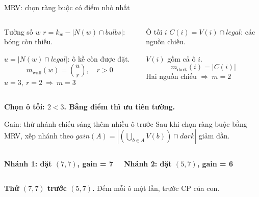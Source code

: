 \begin{frame}{MRV: chọn ràng buộc có điểm nhỏ nhất}
\begin{columns}[T,onlytextwidth]
\begin{block}{Tường số $w$}
\small $r=k_w-|N(w)\cap bulbs|$: bóng còn thiếu.\par
$u=|N(w)\cap legal|$: ô kề còn được đặt.
\[
 m_{\mathrm{wall}}(w)=\binom{u}{r},\quad r>0
\]
\centering $u=3,\ r=2\ \Rightarrow\ \boxed{m=3}$
\end{block}
\begin{block}{Ô tối $i$}
\small $C(i)=V(i)\cap legal$: các nguồn chiếu.\par
$V(i)$ gồm cả ô $i$.
\[
 m_{\mathrm{dark}}(i)=|C(i)|
\]
\centering Hai nguồn chiếu $\Rightarrow\ \boxed{m=2}$
\end{block}
\end{columns}
\vspace{2mm}\centering
\textbf{Chọn ô tối: $2<3$. Bằng điểm thì ưu tiên tường.}
\end{frame}

\begin{frame}{Gain: thử nhánh chiếu sáng thêm nhiều ô trước}
\small Sau khi chọn ràng buộc bằng MRV, xếp nhánh theo
$gain(A)=|(\bigcup_{b\in A}V(b))\cap dark|$ giảm dần.
\begin{columns}[T,onlytextwidth]
\centering
\textbf{Nhánh 1: đặt $(7,7)$, gain = 7}\par\vspace{1mm}

\centering
\textbf{Nhánh 2: đặt $(5,7)$, gain = 6}\par\vspace{1mm}

\end{columns}
\par{}
\small\textbf{Thử $(7,7)$ trước $(5,7)$.} Đếm mỗi ô một lần, trước CP của con.
\end{frame}

